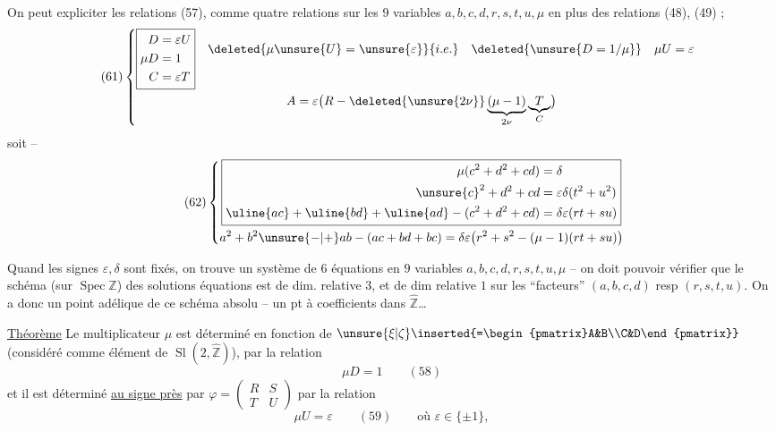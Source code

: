 On peut expliciter les relations (57), comme  quatre relations sur les $9$ variables $a,b,c,d,r,s,t,u,\mu$ en plus des relations (48), (49) ;
\[
\tag{61}
\left\{\begin{gathered}
\boxed{\begin{aligned}
D&=\varepsilon U\\
\mu D&=1\\
C&=\varepsilon T
\end{aligned}}
\quad\begin{aligned}
\deleted{\mu\unsure{U}=\unsure{\varepsilon}}{i.e.}\quad\deleted{\unsure{D=1/\mu}}\quad\mu U=\varepsilon\\
&
\end{aligned}\\
A=\varepsilon\bigl(R-\deleted{\unsure{2\nu}}\underbrace{(\mu-1)}_{2\nu}\underbrace{T}_{C}\bigr)
\end{gathered}\right.
\]
soit --  
\[
\tag{62}
\left\{\begin{gathered}
\boxed{\begin{aligned}
\mu(c^2+d^2+cd)&=\delta\\
\unsure{c}^2+d^2+cd&=\varepsilon\delta(t^2+u^2)\\
\uline{ac}+\uline{bd}+\uline{ad}-(c^2+d^2+cd)&=\delta\varepsilon(rt+su)
\end{aligned}}\\
a^2+b^2\unsure{-|+}ab-(ac+bd+bc)=\delta\varepsilon\bigl(r^2+s^2-(\mu-1)(rt+su)\bigr)
\end{gathered}\right.
\]

Quand les signes $\varepsilon,\delta$ sont fixés, on trouve  un système de $6$ équations en $9$ variables $a,b,c,d,r,s,t,u,\mu$ -- on doit pouvoir vérifier que le schéma (sur $\operatorname{Spec}\mathbb Z$) des solutions  équations est de dim. relative $3$, et de dim relative $1$ sur les ``facteurs'' $(a,b,c,d)$ resp $(r,s,t,u)$. On a donc un point adélique de ce schéma absolu -- un pt à coefficients dans $\widehat{\mathbb Z}$\ldots
{}

\uline{Théorème} Le multiplicateur $\mu$ est déterminé en fonction de $\unsure{\xi|\zeta}\inserted{=\begin{pmatrix}A&B\\C&D\end{pmatrix}}$ (considéré comme élément de $\operatorname{Sl}(2,\widehat{\mathbb Z})$), par la relation
\[
\mu D=1\qquad(58)
\]
\unsure{\textup{(+)}}
et il est déterminé \uline{au signe près} par $\varphi=\begin{pmatrix}R&S\\T&U\end{pmatrix}$ par la relation
\[
\mu U=\varepsilon\qquad(59)\qquad\text{où }\varepsilon\in\{\pm1\},
\]

